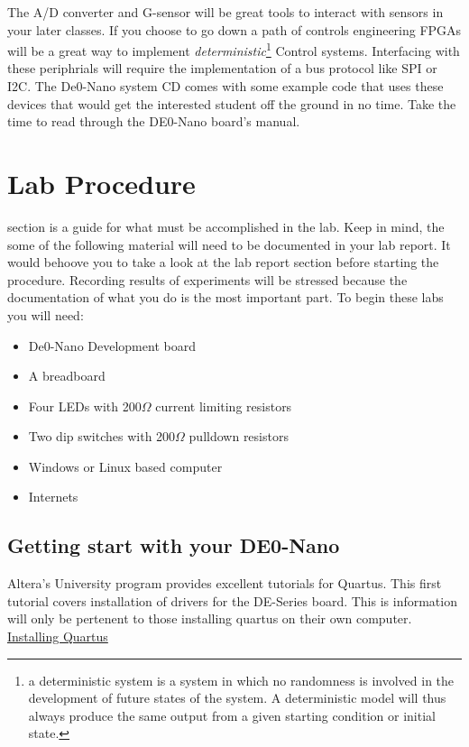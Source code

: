       The A/D converter and G-sensor will be great tools to interact with sensors in your later classes. If you choose to go down a path of controls engineering FPGAs will be a great way to implement {\it deterministic}\footnote{a deterministic system is a system in which no randomness is involved in the development of future states of the system. A deterministic model will thus always produce the same output from a given starting condition or initial state.\cite{DynamicSystems}} Control systems. Interfacing with these periphrials will require the implementation of a bus protocol like SPI or I2C. The De0-Nano system CD comes with some example code that uses these devices that would get the interested student off the ground in no time. Take the time to read through the DE0-Nano board's manual.

  \section{Lab Procedure}
     section is a guide for what must be accomplished in the lab. Keep in mind, the some of the following material will need to be documented in your lab report. It would behoove you to take a look at the lab report section before starting the procedure. Recording results of experiments will be stressed because the documentation of what you do is the most important part. To begin these labs you will need:
    \begin{itemize}
      \item De0-Nano Development board
      \item A breadboard
      \item Four LEDs with 200$\Omega$ current limiting resistors
      \item Two dip switches with 200$\Omega$ pulldown resistors
      \item Windows or Linux based computer
      \item Internets
    \end{itemize}
    
    \subsection{Getting start with your DE0-Nano}
      Altera's University program provides excellent tutorials for Quartus. This first tutorial covers installation of drivers for the DE-Series board. This is information will only be pertenent to those installing quartus on their own computer. \href{http://www.altera.com/literature/manual/quartus_install.pdf}{Installing Quartus} 

